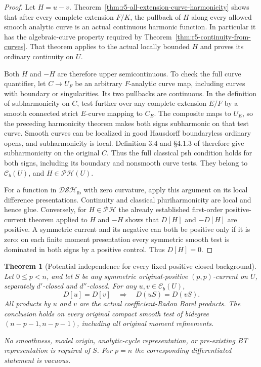 \documentclass[11pt,a4paper]{article}
\numberwithin{equation}{section}
\newtheorem{theorem}{Theorem}[section]
\theoremstyle{definition}
\theoremstyle{remark}
\begin{document}
\begin{proof}
Let $H=u-v$. Theorem~\ref{thm:r5-all-extension-curve-harmonicity}
shows that after every complete extension $F/K$, the pullback
of $H$ along every allowed smooth analytic curve is an actual
continuous harmonic function. In particular it has the
algebraic-curve property required by
Theorem~\ref{thm:r5-continuity-from-curves}. That theorem applies
to the actual locally bounded $H$ and proves its ordinary
continuity on $U$.

Both $H$ and $-H$ are therefore upper semicontinuous. To check
the full curve quantifier, let $C\to U_F$ be an arbitrary
$F$-analytic curve map, including curves with boundary or
singularities. Its two pullbacks are continuous. In the
definition of subharmonicity on $C$, test further over any
complete extension $E/F$ by a smooth connected strict
$E$-curve mapping to $C_E$. The composite maps to $U_E$,
so the preceding harmonicity theorem makes both signs
subharmonic on that test curve. Smooth curves can be
localized in good Hausdorff boundaryless ordinary opens,
and subharmonicity is local. Definition 3.4 and \S4.1.3
of \cite{GR25} therefore give subharmonicity on the original
$C$. Thus the full classical psh condition holds for both
signs, including its boundary and nonsmooth curve tests.
They belong to $\mathcal C_b(U)$, and
$H\in\mathscr{PH}(U)$.

For a function in $\mathscr{DSH}_{\mathrm{lb}}$ with zero
curvature, apply this argument on its local difference
presentations. Continuity and classical pluriharmonicity
are local and hence glue. Conversely, for
$H\in\mathscr{PH}$ the already established first-order
positive-current theorem applied to $H$ and $-H$ shows that
$D[H]$ and $-D[H]$ are positive. A symmetric current and its
negative can both be positive only if it is zero: on each
finite moment presentation every symmetric smooth test is
dominated in both signs by a positive control. Thus $D[H]=0$.
\end{proof}

\begin{theorem}[Potential independence for every fixed positive closed background]
\label{thm:r5-arbitrary-background-potential-quotient}
Let $0\leq p<n$, and let $S$ be any symmetric original-positive
$(p,p)$-current on $U$, separately $d'$-closed and $d''$-closed.
For any $u,v\in\mathcal C_b(U)$,
\[
 D[u]=D[v]\quad\Longrightarrow\quad D(uS)=D(vS).
 \tag{Q}
\]
All products by $u$ and $v$ are the actual coefficient-Radon
Borel products. The conclusion holds on every original compact
smooth test of bidegree $(n-p-1,n-p-1)$, including all original
moment refinements.

No smoothness, model origin, analytic-cycle representation, or
pre-existing BT representation is required of $S$.
For $p=n$ the corresponding differentiated statement is vacuous.
\end{theorem}
\end{document}
